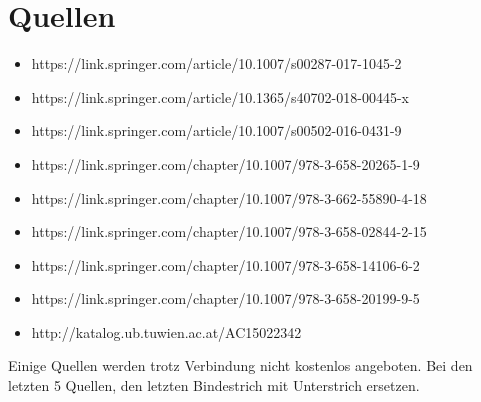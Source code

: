\documentclass[]{protocol}
\begin{document}
\section{Quellen}
\begin{itemize}
	\item https://link.springer.com/article/10.1007/s00287-017-1045-2
	\item https://link.springer.com/article/10.1365/s40702-018-00445-x
	\item https://link.springer.com/article/10.1007/s00502-016-0431-9
	\item https://link.springer.com/chapter/10.1007/978-3-658-20265-1-9
	\item https://link.springer.com/chapter/10.1007/978-3-662-55890-4-18
	\item https://link.springer.com/chapter/10.1007/978-3-658-02844-2-15
	\item https://link.springer.com/chapter/10.1007/978-3-658-14106-6-2
	\item https://link.springer.com/chapter/10.1007/978-3-658-20199-9-5
	\item http://katalog.ub.tuwien.ac.at/AC15022342
\end{itemize}
Einige Quellen werden trotz Verbindung nicht kostenlos angeboten.
Bei den letzten 5 Quellen, den letzten Bindestrich mit Unterstrich ersetzen.

\end{document}

